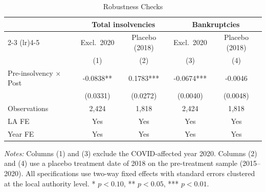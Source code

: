 \begin{table}[htbp]
\centering
\caption{Robustness Checks}
\label{tab:robustness}
\begin{tabular}{lcccc}
\hline\hline
 & \multicolumn{2}{c}{Total insolvencies} & \multicolumn{2}{c}{Bankruptcies} \\
\cmidrule(lr){2-3} \cmidrule(lr){4-5}
 & Excl.~2020 & Placebo (2018) & Excl.~2020 & Placebo (2018) \\
 & (1) & (2) & (3) & (4) \\
\hline
Pre-insolvency $\times$ Post & -0.0838** & 0.1783*** & -0.0674*** & -0.0046 \\
 & (0.0331) & (0.0272) & (0.0040) & (0.0048) \\
\addlinespace
Observations & 2,424 & 1,818 & 2,424 & 1,818 \\
LA FE & Yes & Yes & Yes & Yes \\
Year FE & Yes & Yes & Yes & Yes \\
\hline\hline
\end{tabular}
\begin{tablenotes}
\item \textit{Notes:} Columns (1) and (3) exclude the COVID-affected year 2020. Columns (2) and (4) use a placebo treatment date of 2018 on the pre-treatment sample (2015--2020). All specifications use two-way fixed effects with standard errors clustered at the local authority level. * $p<0.10$, ** $p<0.05$, *** $p<0.01$.
\end{tablenotes}
\end{table}

